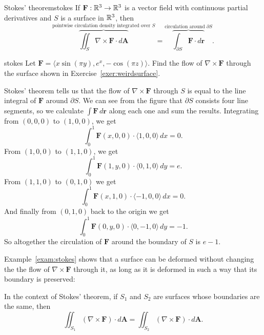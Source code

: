\documentclass[svgnames]{report}
\begin{document}
\begin{theo}{Stokes' theorem}{stokes}
  If $\mathbf{F} : \mathbb{R}^3 \to \mathbb{R}^3$ is a vector field with continuous
  partial derivatives and $S$ is a surface in $\mathbb{R}^3$, then
  \[
    \overbrace{\iint_S \nabla \times \mathbf{F} \cdot
      d\mathbf{A}}^{\text{pointwise circulation density integrated
        over $S$}} =
    \overbrace{\int_{\partial S} \mathbf{F} \cdot
      d\mathbf{r}}^{\text{circulation around $\partial S$}}. 
  \]
\end{theo}

\begin{example}{}{stokes}
  Let $\mathbf{F} = \langle x \sin (\pi y), e^x, -\cos(\pi z)
  \rangle$. Find the flow of $\nabla \times \mathbf{F}$ through the
  surface shown in Exercise~\ref{exer:weirdsurface}.
\end{example}

\begin{solution} 
  Stokes' theorem tells us that the flow of $\nabla \times \mathbf{F}$
  through $S$ is equal to the line integral of $\mathbf{F}$ around
  $\partial S$. We can see from the figure that $\partial S$ consists
  four line segments, so we calculate $\int \mathbf{F} \, d\mathbf{r}$
  along each one and sum the results. Integrating from $(0,0,0)$ to
  $(1,0,0)$, we get
  \[
    \int_0^1\mathbf{F}(x,0,0) \cdot \langle 1, 0, 0 \rangle  \, dx =
    0. 
  \]
  From $(1,0,0)$ to $(1,1,0)$, we get
  \[
    \int_0^1\mathbf{F}(1,y,0) \cdot \langle 0, 1, 0 \rangle  \, dy =
    e. 
  \]
  From $(1,1,0)$ to $(0,1,0)$ we get
  \[
    \int_0^1\mathbf{F}(x,1,0) \cdot \langle -1, 0, 0 \rangle  \, dx = 0. 
  \]
  And finally from $(0,1,0)$ back to the origin we get
  \[
    \int_0^1\mathbf{F}(0,y,0) \cdot \langle 0, -1, 0 \rangle  \, dy = -1. 
  \]
  So altogether the circulation of $\mathbf{F}$ around the boundary of
  $S$ is $\boxed{e-1}$. 
\end{solution}

Example~\ref{exam:stokes} shows that a surface can be deformed without
changing the the flow of $\nabla \times \mathbf{F}$ through it, as
long as it is deformed in such a way that its boundary is preserved: 

\begin{obs}{}{}
  In the context of Stokes' theorem, if $S_1$ and $S_2$ are surfaces
  whose boundaries are the same, then
  \[
    \iint_{S_1} (\nabla \times \mathbf{F}) \cdot d\mathbf{A} =
  \iint_{S_2}
  (\nabla \times \mathbf{F})
  \cdot d\mathbf{A}. 
\]
\end{obs}
\end{document}
